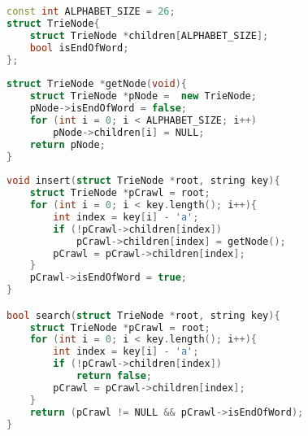 \begin{lstlisting}[language=C++]
const int ALPHABET_SIZE = 26;
struct TrieNode{
    struct TrieNode *children[ALPHABET_SIZE];
    bool isEndOfWord;
};
 
struct TrieNode *getNode(void){
    struct TrieNode *pNode =  new TrieNode;
    pNode->isEndOfWord = false;
    for (int i = 0; i < ALPHABET_SIZE; i++)
        pNode->children[i] = NULL;
    return pNode;
}
 
void insert(struct TrieNode *root, string key){
    struct TrieNode *pCrawl = root;
    for (int i = 0; i < key.length(); i++){
        int index = key[i] - 'a';
        if (!pCrawl->children[index])
            pCrawl->children[index] = getNode();
        pCrawl = pCrawl->children[index];
    }
    pCrawl->isEndOfWord = true;
}

bool search(struct TrieNode *root, string key){
    struct TrieNode *pCrawl = root;
    for (int i = 0; i < key.length(); i++){
        int index = key[i] - 'a';
        if (!pCrawl->children[index])
            return false;
        pCrawl = pCrawl->children[index];
    }
    return (pCrawl != NULL && pCrawl->isEndOfWord);
}
\end{lstlisting}
